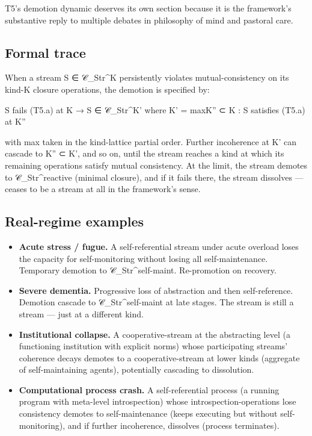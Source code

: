\documentclass[11pt, openany]{book}
\begin{document}
T5's demotion dynamic deserves its own section because it is the framework's substantive reply to multiple debates in philosophy of mind and pastoral care.

\subsection{Formal trace}

When a stream S ∈ 𝒞\_\allowbreak{}Str\textasciicircum{}K persistently violates mutual-consistency on its kind-K closure operations, the demotion is specified by:

\begin{Code}
S fails (T5.a) at K → S ∈ 𝒞_Str^{K'} where K' = max{K'' ⊂ K : S satisfies (T5.a) at K''}
\end{Code}

with max taken in the kind-lattice partial order. Further incoherence at K' can cascade to K'' ⊂ K', and so on, until the stream reaches a kind at which its remaining operations satisfy mutual consistency. At the limit, the stream demotes to 𝒞\_\allowbreak{}Str\textasciicircum{}reactive (minimal closure), and if it fails there, the stream dissolves --- ceases to be a stream at all in the framework's sense.

\subsection{Real-regime examples}

\begin{itemize}
\item \textbf{Acute stress / fugue.} A self-referential stream under acute overload loses the capacity for self-monitoring without losing all self-maintenance. Temporary demotion to 𝒞\_\allowbreak{}Str\textasciicircum{}self-maint. Re-promotion on recovery.
\item \textbf{Severe dementia.} Progressive loss of abstraction and then self-reference. Demotion cascade to 𝒞\_\allowbreak{}Str\textasciicircum{}self-maint at late stages. The stream is still a stream --- just at a different kind.
\item \textbf{Institutional collapse.} A cooperative-stream at the abstracting level (a functioning institution with explicit norms) whose participating streams' coherence decays demotes to a cooperative-stream at lower kinds (aggregate of self-maintaining agents), potentially cascading to dissolution.
\item \textbf{Computational process crash.} A self-referential process (a running program with meta-level introspection) whose introspection-operations lose consistency demotes to self-maintenance (keeps executing but without self-monitoring), and if further incoherence, dissolves (process terminates).
\end{itemize}
\end{document}
